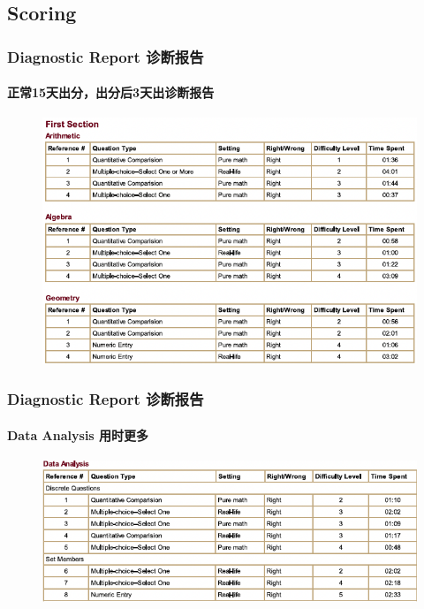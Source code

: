 \documentclass[
	11pt, %
]{beamer}
\begin{document}
\subsection{Scoring}

\begin{frame}
	\frametitle{Diagnostic Report 诊断报告}
	\framesubtitle{正常15天出分，出分后3天出诊断报告}
	
	\begin{figure}
		\includegraphics[width=0.9\linewidth]{Diagnostic_Report_Section1_1.png}
	\end{figure}
\end{frame}


\begin{frame}
	\frametitle{Diagnostic Report 诊断报告}
	\framesubtitle{Data Analysis 用时更多}
	
	\begin{figure}
		\includegraphics[width=0.9\linewidth]{Diagnostic_Report_Section1_2.png}
	\end{figure}
\end{frame}

\end{document}
